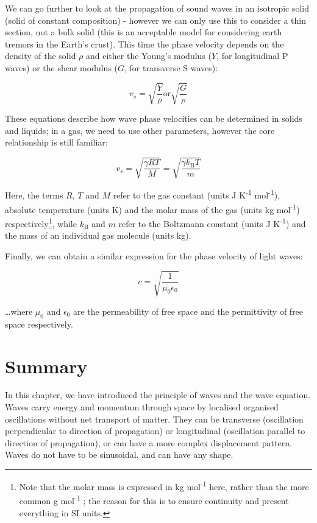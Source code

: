 \documentclass[
]{book}
\begin{document}
We can go further to look at the propagation of sound waves in an isotropic solid (solid of constant composition) - however we can only use this to consider a thin section, not a bulk solid (this is an acceptable model for considering earth tremors in the Earth's crust). This time the phase velocity depends on the density of the solid \(\rho\) and either the Young's modulus (\(Y\), for longitudinal P waves) or the shear modulus (\(G\), for transverse S waves):

\begin{equation}
v_s = \sqrt{\frac{Y}{\rho}} \textrm{or} \sqrt{\frac{G}{\rho}}
\end{equation}

These equations describe how wave phase velocities can be determined in solids and liquids; in a gas, we need to use other parameters, however the core relationship is still familiar:

\begin{equation}
v_s = \sqrt{\frac{\gamma RT}{M}} =  \sqrt{\frac{\gamma k_{\mathrm{B}}T}{m}}
\end{equation}

Here, the terms \(R\), \(T\) and \(M\) refer to the gas constant (units J K\textsuperscript{-1} mol\textsuperscript{-1}), absolute temperature (units K) and the molar mass of the gas (units kg mol\textsuperscript{-1}) respectively\footnote{Note that the molar mass is expressed in kg mol\textsuperscript{-1} here, rather than the more common g mol\textsuperscript{-1} ; the reason for this is to ensure continuity and present everything in SI units.}, while \(k_{\textrm{B}}\) and \(m\) refer to the Boltzmann constant (units J K\textsuperscript{-1}) and the mass of an individual gas molecule (units kg).

Finally, we can obtain a similar expression for the phase velocity of light waves:

\begin{equation}
c = \sqrt{\frac{1}{\mu_0 \epsilon_0}}
\end{equation}

\ldots where \(\mu_0\) and \(\epsilon_0\) are the permeability of free space and the permittivity of free space respectively.

\hypertarget{sec:ch6-summary}{%
\section{Summary}\label{sec:ch6-summary}}

In this chapter, we have introduced the principle of waves and the wave equation. Waves carry energy and momentum through space by localised organised oscillations without net transport of matter. They can be transverse (oscillation perpendicular to direction of propagation) or longitudinal (oscillation parallel to direction of propagation), or can have a more complex displacement pattern. Waves do not have to be sinusoidal, and can have any shape.
\end{document}

